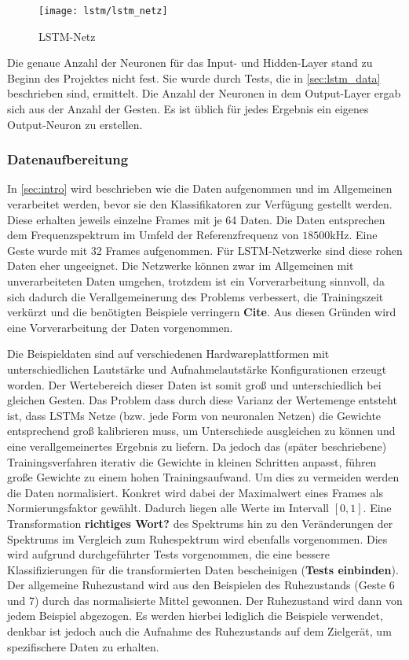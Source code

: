\begin{figure}[htbp]
    \centering
   \texttt{[image: lstm/lstm\_netz]}
\caption{LSTM-Netz}
\label{fig:lstm_netz}
\end{figure}
Die genaue Anzahl der Neuronen für das Input- und Hidden-Layer stand zu Beginn
des Projektes nicht fest. Sie wurde durch Tests, die in \autoref{sec:lstm_data}
beschrieben sind, ermittelt. Die Anzahl der Neuronen in dem Output-Layer ergab
sich aus der Anzahl der Gesten. Es ist üblich für jedes Ergebnis ein eigenes
Output-Neuron zu erstellen.

\subsubsection{Datenaufbereitung}
\label{sec:lstm_data}

In \autoref{sec:intro} wird beschrieben wie die Daten aufgenommen und
im Allgemeinen verarbeitet werden, bevor sie den Klassifikatoren zur
Verfügung gestellt werden. Diese erhalten jeweils einzelne Frames mit je 64
Daten. Die Daten entsprechen dem Frequenzspektrum im Umfeld der
Referenzfrequenz von $18500\text{kHz}$. Eine Geste wurde mit 32 Frames
aufgenommen. Für \ac{LSTM}-Netzwerke sind diese rohen Daten eher ungeeignet. Die
Netzwerke können zwar im Allgemeinen mit unverarbeiteten Daten umgehen,
trotzdem ist ein Vorverarbeitung sinnvoll, da sich dadurch die Verallgemeinerung
des Problems verbessert, die Trainingszeit verkürzt und die benötigten Beispiele
verringern \textbf{Cite}. Aus diesen Gründen wird eine Vorverarbeitung der Daten
vorgenommen. 

Die Beispieldaten sind auf verschiedenen Hardwareplattformen mit
unterschiedlichen Lautstärke und Aufnahmelautstärke Konfigurationen erzeugt
worden. Der Wertebereich dieser Daten ist somit groß und unterschiedlich bei
gleichen Gesten. Das Problem dass durch diese Varianz der Wertemenge entsteht
ist, dass \acp{LSTM} Netze (bzw. jede Form von neuronalen Netzen) die Gewichte
entsprechend groß kalibrieren muss, um Unterschiede ausgleichen zu können und
eine verallgemeinertes Ergebnis zu liefern. Da jedoch das (später beschriebene)
Trainingsverfahren iterativ die Gewichte in kleinen Schritten anpasst, führen
große Gewichte zu einem hohen Trainingsaufwand. Um dies zu vermeiden werden die
Daten normalisiert. Konkret wird dabei der Maximalwert eines Frames als
Normierungsfaktor gewählt. Dadurch liegen alle Werte im Intervall $[0,1]$.
Eine Transformation \textbf{richtiges Wort?} des Spektrums hin zu den
Veränderungen der Spektrums im Vergleich zum Ruhespektrum wird ebenfalls
vorgenommen. Dies wird aufgrund durchgeführter Tests vorgenommen, die eine
bessere Klassifizierungen für die transformierten Daten bescheinigen
(\textbf{Tests einbinden}). Der allgemeine Ruhezustand wird aus den Beispielen
des Ruhezustands (Geste 6 und 7) durch das normalisierte Mittel gewonnen. Der
Ruhezustand wird dann von jedem Beispiel abgezogen. Es werden hierbei lediglich
die Beispiele verwendet, denkbar ist jedoch auch die Aufnahme des Ruhezustands
auf dem Zielgerät, um spezifischere Daten zu erhalten. 

